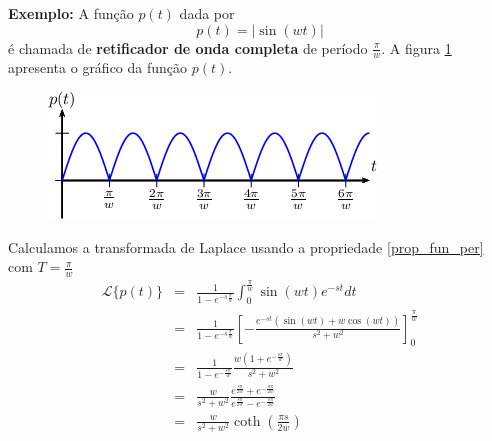 \documentclass[a4paper,10pt]{book}
\begin{document}
{\bf Exemplo:} A função $p(t)$ dada por
\begin{equation}
p(t)=|\sin(wt)|
\end{equation}
 é chamada de {\bf retificador de onda completa} de período $\frac{\pi}{w}$. A figura \ref{fig_ret_onda_completa} apresenta o gráfico da função $p(t)$.
  \begin{figure}[!ht]
 \begin{center}
% 
 \includegraphics{figs/especiais_figura_4}\end{center}
 \caption{\label{fig_ret_onda_completa}}
 \end{figure}
 Calculamos a transformada de Laplace usando a propriedade \ref{prop_fun_per} com $T=\frac{\pi}{w}$
 \begin{eqnarray*}
 \mathcal{L}\{p(t)\}&=& \frac{1}{1-e^{-s\frac{\pi}{w}}}\int_0^{\frac{\pi}{w}}\sin(wt)e^{-st}dt\\
 &=& \frac{1}{1-e^{-s\frac{\pi}{w}}} \left[-\frac{e^{-st}\left(\sin(wt)+w\cos(wt)\right)}{s^2+w^2}\right]_0^{\frac{\pi}{w}}\\
 &=& \frac{1}{1-e^{-\frac{s\pi}{w}}} \frac{w(1+e^{-\frac{s\pi}{w}})}{s^2+w^2}\\
 &=&  \frac{w}{s^2+w^2}\frac{e^{\frac{s\pi}{2w}}+e^{-\frac{s\pi}{2w}}}{e^{\frac{s\pi}{2w}}-e^{-\frac{s\pi}{2w}}}\\
 &=&  \frac{w}{s^2+w^2}\coth\left( \frac{\pi s}{2w}\right)
 \end{eqnarray*}
\end{document}
